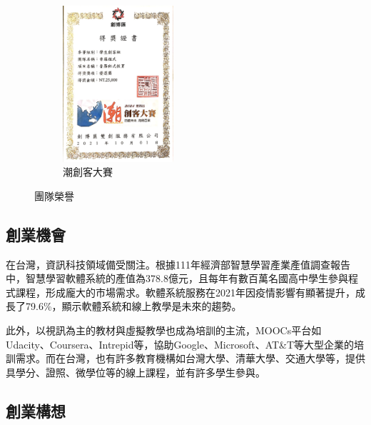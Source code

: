 \begin{figure}[H]
  \begin{subfigure}{0.31\linewidth}
    \centering
    \includegraphics[width=0.45\textwidth]{images/創博匯.jpg}
    \caption{潮創客大賽}
    \label{fig:Awards-2}
  \end{subfigure}
  \caption{團隊榮譽}
\end{figure}

\subsection{創業機會}
在台灣，資訊科技領域備受關注。根據111年經濟部智慧學習產業產值調查報告\cite{ref:111產業產值調查報告}中，智慧學習軟體系統的產值為378.8億元，且每年有數百萬名國高中學生參與程式課程\cite{ref:學生數量}，形成龐大的市場需求。軟體系統服務在2021年因疫情影響有顯著提升，成長了79.6\%，顯示軟體系統和線上教學是未來的趨勢。

此外，以視訊為主的教材與虛擬教學也成為培訓的主流\cite{ref:企業培訓}，MOOCs平台如Udacity、Coursera、Intrepid等，協助Google、Microsoft、AT\&T等大型企業的培訓需求。而在台灣，也有許多教育機構如台灣大學、清華大學、交通大學等，提供具學分、證照、微學位等的線上課程，並有許多學生參與。

\subsection{創業構想}

